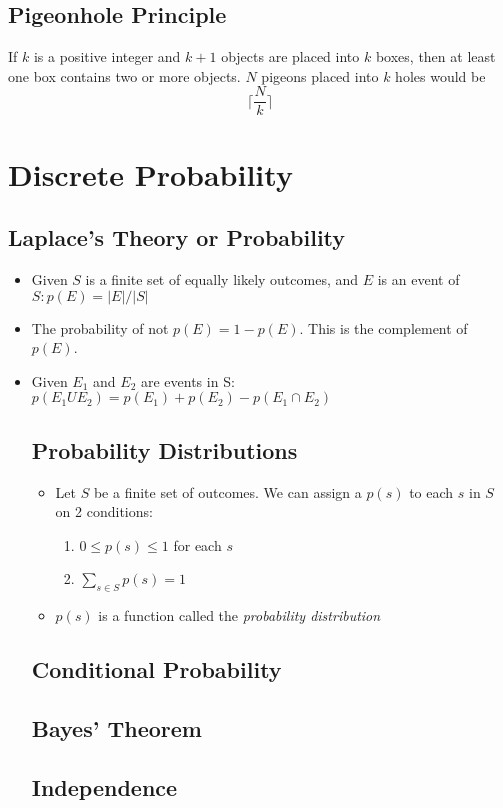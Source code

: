 \documentclass[letter]{article}
\begin{document}
\begin{multicols}{2}
	\subsection{Pigeonhole Principle}
	If $k$ is a positive integer and $k + 1$ objects are placed into $k$ boxes,
	then at least one box contains two or more objects. $N$ pigeons placed into
	$k$ holes would be
	$$\lceil\dfrac{N}{k}\rceil$$

	\section{Discrete Probability}
	\subsection{Laplace's Theory or Probability}
	\begin{itemize}
		\item Given $S$ is a finite set of equally likely outcomes, and $E$ is an event of $S: p(E) = |E|/|S|$
		\item The probability of not $p(E) = 1 - p(E)$. This is the complement of $p(E)$.
		\item Given $E_1$ and $E_2$ are events in S: $p(E_1 U E_2) = p(E_1) + p(E_2) - p(E_1 \cap E_2)$
	\subsection{Probability Distributions}
	\begin{itemize}
		\item Let $S$ be a finite set of outcomes. We can assign a $p(s)$ to each $s$ in $S$ on 2 conditions:
		\begin{enumerate}
			\item $0 \leq p(s) \leq 1$ for each $s$
			\item $\sum_{s \in S}p(s) = 1$
		\end{enumerate}
		\item $p(s)$ is a function called the \textit{probability distribution}
	\end{itemize}
	\subsection{Conditional Probability}
	\subsection{Bayes' Theorem}
	\subsection{Independence}

\end{itemize}
\end{multicols}
\end{document}
